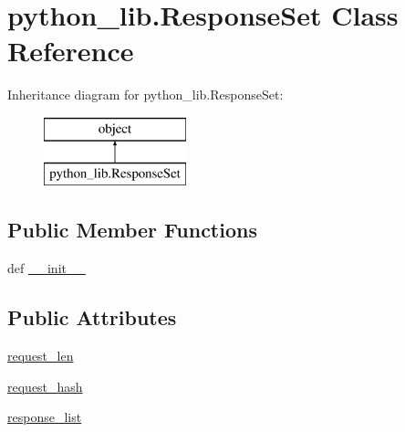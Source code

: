 \hypertarget{classpython__lib_1_1_response_set}{\section{python\-\_\-lib.\-Response\-Set Class Reference}
\label{classpython__lib_1_1_response_set}
}
Inheritance diagram for python\-\_\-lib.\-Response\-Set\-:\begin{figure}[H]
\begin{center}
\leavevmode
\includegraphics[height=2.000000cm]{classpython__lib_1_1_response_set}
\end{center}
\end{figure}
\subsection*{Public Member Functions}
\begin{DoxyCompactItemize}
\item 
def \hyperlink{classpython__lib_1_1_response_set_ac9490fc227817ba2aabb44e29bad3790}{\-\_\-\-\_\-init\-\_\-\-\_\-}
\end{DoxyCompactItemize}
\subsection*{Public Attributes}
\begin{DoxyCompactItemize}
\item 
\hyperlink{classpython__lib_1_1_response_set_a367476495a8153449e57c0bd7e03057f}{request\-\_\-len}
\item 
\hyperlink{classpython__lib_1_1_response_set_a8a94812ec58f4aeb8d25e7db276ffd18}{request\-\_\-hash}
\item 
\hyperlink{classpython__lib_1_1_response_set_add79790ff3d888c6660a05f97ca39f7d}{response\-\_\-list}
\end{DoxyCompactItemize}


